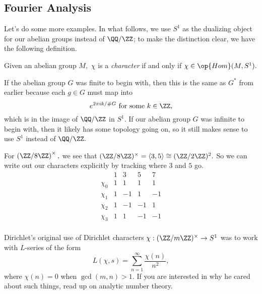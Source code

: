 \documentclass[../notes.tex]{subfiles}
\begin{document}
\subsection{Fourier Analysis}
Let's do some more examples. In what follows, we use $S^1$ as the dualizing object for our abelian groups instead of $\QQ/\ZZ$; to make the distinction clear, we have the following definition.
\begin{defi}[Character]
	Given an abelian group $M,$ $\chi$ is a \textit{character} if and only if $\chi\in\op{Hom}(M,S^1).$
\end{defi}
If the abelian group $G$ was finite to begin with, then this is the same as $G^*$ from earlier because each $g\in G$ must map into
\[e^{2\pi ik/\#G}\text{ for some }k\in\ZZ,\]
which is in the image of $\QQ/\ZZ$ in $S^1.$ If our abelian group $G$ was infinite to begin with, then it likely has some topology going on, so it still makes sense to use $S^1$ instead of $\QQ/\ZZ.$
\begin{example}
	For $\left(\ZZ/8\ZZ\right)^\times,$ we see that $(\ZZ/8\ZZ)^\times=\langle3,5\rangle\cong(\ZZ/2\ZZ)^2.$ So we can write out our characters explicitly by tracking where $3$ and $5$ go.
	\[\begin{array}{c|cccc}
		 & 1 & 3 & 5 & 7 \\\hline
		\chi_0 & 1 & 1 & 1 & 1 \\
		\chi_1 & 1 & -1 & 1 & -1 \\
		\chi_2 & 1 & -1 & -1 & 1 \\
		\chi_3 & 1 & 1 & -1 & -1 \\
	\end{array}\]
\end{example}
\begin{remark}
	Dirichlet's original use of Dirichlet characters $\chi:(\ZZ/m\ZZ)^\times\to S^1$ was to work with $L$-series of the form
	\[L(\chi,s)=\sum_{n=1}^\infty\frac{\chi(n)}{n^2},\]
	where $\chi(n)=0$ when $\gcd(m,n)>1.$ If you are interested in why he cared about such things, read up on analytic number theory.
\end{remark}
\end{document}
